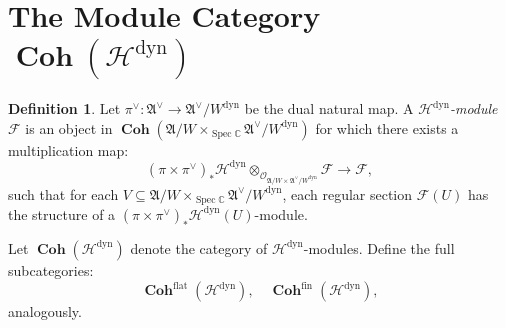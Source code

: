 \documentclass[a4paper]{report}
\theoremstyle{theorem}
\theoremstyle{definition}
\newtheorem{definition}{Definition}
\theoremstyle{remark}
\theoremstyle{proposition}
\theoremstyle{conjecture}
\theoremstyle{lemma}
\theoremstyle{corollary}
\theoremstyle{exercise}
\theoremstyle{example}
\newcommand{\C}{\mathbb{C}}
\newcommand{\mcal}{\mathcal}
\newcommand{\on}{\operatorname}
\newcommand{\spec}{\on{Spec}}
\newcommand{\coh}{\on{\mathbf{Coh}}}
\newcommand{\dyn}{{\on{dyn}}}
\begin{document}
  \section{The Module Category $\coh(\mcal{H}^\dyn)$}
  \begin{definition}
      Let $\pi^\vee : \mathfrak{A}^\vee \to \mathfrak{A}^\vee/W^\dyn$ be the dual natural map.
      A \emph{$\mcal{H}^\dyn$-module} $\mcal{F}$ is an object in 
      $\coh(\mathfrak{A}/W \times_{\spec \C} \mathfrak{A}^\vee/W^\dyn)$ 
      for which there exists a multiplication map:
      $$(\pi \times \pi^\vee)_\ast\mcal{H}^\dyn \otimes_{\mcal{O}_{\mathfrak{A}/W \times \mathfrak{A}^\vee/W^\dyn}} \mcal{F} \longrightarrow \mcal{F},$$ 
      such that for each $V \subseteq \mathfrak{A}/W \times_{\spec \C} \mathfrak{A}^\vee/W^\dyn$,
      each regular section $\mcal{F}(U)$ has the structure of a $(\pi \times \pi^\vee)_\ast\mcal{H}^\dyn(U)$-module.
  \end{definition}
  Let $\coh(\mcal{H}^\dyn)$ denote the category of $\mcal{H}^\dyn$-modules. Define 
  the full subcategories:
  $$\coh^{\on{flat}}(\mcal{H}^\dyn), \quad \coh^{\on{fin}}(\mcal{H}^\dyn),$$
  analogously.
\end{document}
